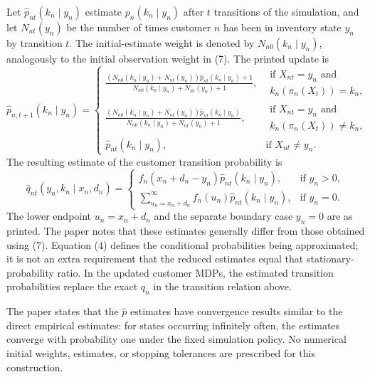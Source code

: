 \documentclass{article}
\begin{document}
Let $\hat p_{nt}(k_n\mid y_n)$ estimate $p_n(k_n\mid y_n)$ after $t$ transitions of the simulation, and let $N_{nt}(y_n)$ be the number of times customer $n$ has been in inventory state $y_n$ by transition $t$. The initial-estimate weight is denoted by $N_{n0}(k_n\mid y_n)$, analogously to the initial observation weight in (7). The printed update is
\[
\hat p_{n,t+1}(k_n\mid y_n)=
\begin{cases}
\displaystyle
\frac{(N_{n0}(k_n\mid y_n)+N_{nt}(y_n))\hat p_{nt}(k_n\mid y_n)+1}
{N_{n0}(k_n\mid y_n)+N_{nt}(y_n)+1},
&\begin{array}{l}
\text{if }X_{nt}=y_n\text{ and}\\
k_n(\pi_n(X_t))=k_n,
\end{array}\\[4mm]
\displaystyle
\frac{(N_{n0}(k_n\mid y_n)+N_{nt}(y_n))\hat p_{nt}(k_n\mid y_n)}
{N_{n0}(k_n\mid y_n)+N_{nt}(y_n)+1},
&\begin{array}{l}
\text{if }X_{nt}=y_n\text{ and}\\
k_n(\pi_n(X_t))\ne k_n,
\end{array}\\[4mm]
\hat p_{nt}(k_n\mid y_n),&\text{if }X_{nt}\ne y_n.
\end{cases}
\]
The resulting estimate of the customer transition probability is
\[
\hat q_{nt}(y_n,k_n\mid x_n,d_n)=
\begin{cases}
f_n(x_n+d_n-y_n)\hat p_{nt}(k_n\mid y_n),&\text{if }y_n>0,\\[1mm]
\displaystyle\sum_{u_n=x_n+d_n}^{\infty}f_n(u_n)\hat p_{nt}(k_n\mid y_n),&\text{if }y_n=0.
\end{cases}
\]
The lower endpoint $u_n=x_n+d_n$ and the separate boundary case $y_n=0$ are as printed. The paper notes that these estimates generally differ from those obtained using (7). Equation (4) defines the conditional probabilities being approximated; it is not an extra requirement that the reduced estimates equal that stationary-probability ratio. In the updated customer MDPs, the estimated transition probabilities replace the exact $q_n$ in the transition relation above.

The paper states that the $\hat p$ estimates have convergence results similar to the direct empirical estimates: for states occurring infinitely often, the estimates converge with probability one under the fixed simulation policy. No numerical initial weights, estimates, or stopping tolerances are prescribed for this construction.
\end{document}
